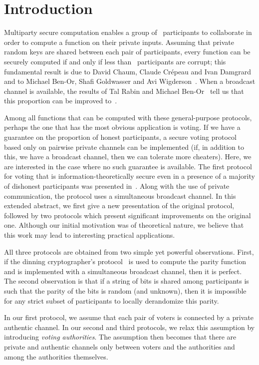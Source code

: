 \documentclass[runningheads]{llncs}
\begin{document}
\section{Introduction}



Multiparty secure computation enables
a group of~ participants  to collaborate in order to compute a
function on their private inputs. Assuming that private random keys
are shared between each pair of participants,  every function can be
securely computed
if and only if less than~
participants are corrupt; this fundamental result is due to  David
Chaum, Claude Cr\'epeau and Ivan Damg\a rard~\cite{CCD88} and to
Michael Ben-Or, Shafi Goldwasser and Avi Wigderson~\cite{BGW88}.
When a broadcast channel is available, the results of Tal Rabin and
Michael \mbox{Ben-Or}~\cite{RB89} tell us that this proportion can
be improved to~.

Among all functions that can be computed with these general-purpose
protocols, perhaps the one that has the most obvious application is
voting. If we have a guarantee on the proportion of honest
participants, a secure voting protocol based only on pairwise
private channels can be implemented (if, in addition to this, we have a broadcast channel, then we can
tolerate more cheaters). Here, we are interested in the case where no such guarantee is
available. The first protocol for voting that is
information-theoretically secure even in a presence of a majority of
dishonest participants was presented in~\cite{BroadbentTapp}. Along
with the use of private communication, the protocol uses a
simultaneous broadcast channel. In this extended abstract, we first
give a new presentation of the original protocol, followed by two
protocols which present significant improvements on the original
one. Although our initial motivation  was of theoretical nature, we
believe that this work may lead to interesting practical
applications.

All three protocols are obtained from two simple yet powerful
observations. First, if the dinning cryptographer's
protocol~\cite{Chaum88} is used to compute the parity function and
is implemented with a simultaneous broadcast channel, then it is
perfect. The second observation is that if a string of  bits is
shared among  participants is such that the parity of the 
bits is random (and unknown), then it is impossible for any strict
subset of participants to locally derandomize this parity.


In our first protocol, we assume that each pair of voters is
connected by a private authentic channel. In our second and third
protocols, we relax this assumption by  introducing \emph{voting
authorities}. The assumption then becomes that there are private and
authentic channels only between voters and the authorities and among
the authorities themselves.
\end{document}
